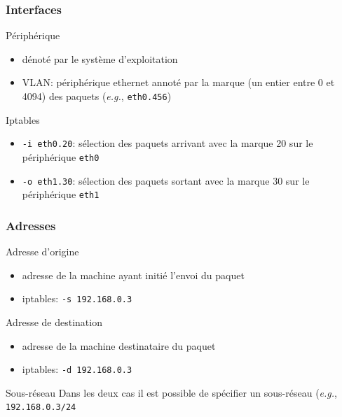 \begin{reveals}
\begin{frame}
  \frametitle{Interfaces}
  \vfill
  \begin{block}{Périphérique}
    \begin{itemize}
    \item dénoté par le système d'exploitation
    \item VLAN: périphérique ethernet annoté par la marque (un entier
      entre 0 et 4094) des paquets (\textit{e.g.}, \texttt{eth0.456})
    \end{itemize}
  \end{block}
  \vfill
  \begin{block}{Iptables}
    \begin{itemize}
    \item \texttt{-i eth0.20}: sélection des paquets arrivant avec la
      marque 20 sur le périphérique \texttt{eth0}
    \item \texttt{-o eth1.30}: sélection des paquets sortant avec la
      marque 30 sur le périphérique \texttt{eth1}
    \end{itemize}
  \end{block}
  \vfill
\end{frame}

\begin{frame}
  \frametitle{Adresses}
  \vfill
  \begin{block}{Adresse d'origine}
    \begin{itemize}
    \item adresse de la machine ayant initié l'envoi du paquet
    \item iptables: \texttt{-s 192.168.0.3}
    \end{itemize}
  \end{block}
  \vfill
  \begin{block}{Adresse de destination}
    \begin{itemize}
    \item adresse de la machine destinataire du paquet
    \item iptables: \texttt{-d 192.168.0.3}
    \end{itemize}
  \end{block}
  \vfill
  \begin{block}{Sous-réseau}
    Dans les deux cas il est possible de spécifier un sous-réseau
    (\textit{e.g.}, \texttt{192.168.0.3/24}
  \end{block}
  \vfill
\end{frame}


\end{reveals}
